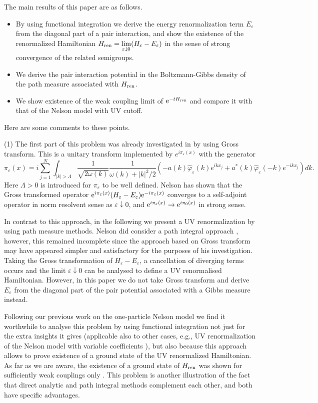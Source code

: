 \documentclass[11pt]{article}
\providecommand{\eq}[1]{\begin{equation}\label{#1}}
\providecommand{\en}{\end{equation}}
\renewcommand{\d}{\displaystyle}
\providecommand{\bi}
{\begin{itemize}}
\providecommand{\ei}{\end{itemize} }
\providecommand{\hni}{\hn_\ren }
\providecommand{\hn}{H}%
\providecommand{\add}{a^\ast}
\providecommand{\La}{{\Lambda}}
\providecommand{\e}{{\rm e}}
\providecommand{\1}{\mathbb{1}}
\providecommand{\eps}{\varepsilon}
\providecommand{\ren}{{\rm ren}}
\begin{document}
The main results of this paper are as follows.
\bi
\item[(1)]
By using functional integration we derive the energy renormalization term $E_\eps$ from the diagonal part of
a pair interaction, and show the existence of the renormalized Hamiltonian $\d \hn_\ren =\lim_{\eps\downarrow 0}
(\hn_\eps-E_\eps)$ in the sense of strong convergence of the related semigroups.
\item[(2)]
We derive the pair interaction potential in the Boltzmann-Gibbs density of the path measure associated with
$\hni$.
\item[(3)]
We show existence of the weak coupling limit  of $\e^{-t\hni}$ and compare it with that of the Nelson model
with UV cutoff.
\ei
Here are some comments to these points.

\medskip
\noindent
(1) The first part of this problem was already investigated in \cite{nel64} by using Gross transform. This
is a unitary transform implemented by $e^{i\pi_\eps(x)}$ with the generator
\eq{gross}
\pi_\eps(x)=i\sum_{j=1}^N \int_{|k|>\Lambda} \frac{1}{\sqrt{2\omega(k)}}\frac{1}{\omega(k)+|k|^2/2}
(-a(k)\widehat \varphi_\eps(k)e^{ikx_j}+\add(k)\widehat\varphi_\eps(-k)e^{-ikx_j})dk.
\en
Here $\La>0$ is introduced  for $\pi_\eps$ to be well defined. Nelson has shown that the Gross transformed
operator $\e^{i\pi_\eps(x)} (H_\eps-E_\eps) \e^{-i\pi_\eps(x)}$ converges to a self-adjoint operator in norm
resolvent sense as $\eps\downarrow 0$, and $\e^{i\pi_\eps(x)}\to \e^{i\pi_0(x)}$ in strong sense.

In contrast to this approach, in the following we present a UV renormalization by using path measure methods.
Nelson did consider a path integral approach \cite{nel64b}, however, this remained incomplete since the approach
based on Gross transform may have appeared simpler and satisfactory for the purposes of his investigation.
Taking the Gross transformation of $\hn_\eps-E_\eps$, a cancellation of diverging terms occurs and the limit
$\eps\downarrow 0$ can be analysed to define a UV renormalised Hamiltonian. However, in this paper we do not
take Gross transform and derive $E_\eps$ from the diagonal part of the pair potential associated with a Gibbs
measure instead.

Following our previous work on the one-particle Nelson model \cite{lms02,bhlms02} we find it worthwhile to
analyse this problem by using functional integration not just for the extra insights it gives (applicable
also to other cases, e.g., UV renormalization of the Nelson model with variable coefficients \cite{ghps12}),
but also because this approach allows to prove existence of a ground state of the UV renormalized Hamiltonian.
As far as we are aware, the existence of a ground state of $H_\ren$ was shown for sufficiently weak couplings
only \cite{hhs05}. This problem is another illustration of the fact that direct analytic and path integral
methods complement each other, and both have specific advantages.
\end{document}
